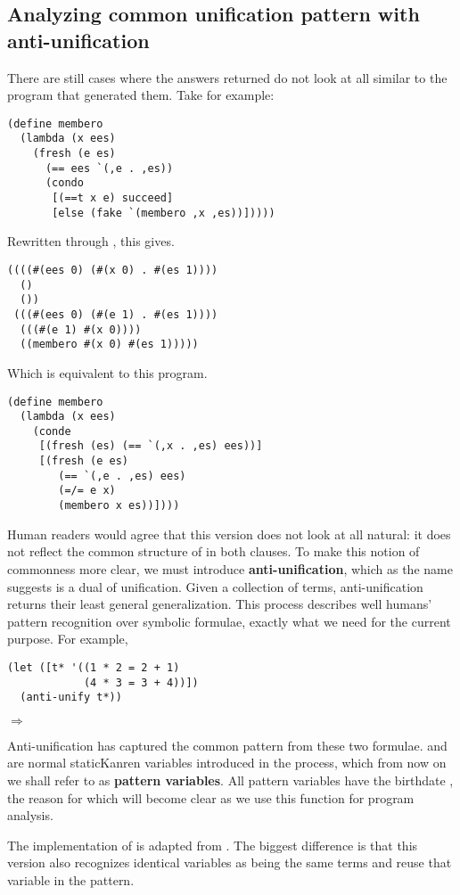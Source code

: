 \subsection{Analyzing common unification pattern with anti-unification}\label{au}
There are still cases where the answers returned do not look at all similar to the program that generated them. Take  for example:
\begin{lstlisting}
(define membero
  (lambda (x ees)
    (fresh (e es)
      (== ees `(,e . ,es))
      (condo
       [(==t x e) succeed]
       [else (fake `(membero ,x ,es))]))))
\end{lstlisting}

Rewritten through , this gives.
\begin{lstlisting}
((((#(ees 0) (#(x 0) . #(es 1)))) 
  ()
  ())
 (((#(ees 0) (#(e 1) . #(es 1))))
  (((#(e 1) #(x 0))))
  ((membero #(x 0) #(es 1)))))
\end{lstlisting}
Which is equivalent to this program.
\begin{lstlisting}
(define membero
  (lambda (x ees)
    (conde
     [(fresh (es) (== `(,x . ,es) ees))]
     [(fresh (e es)
        (== `(,e . ,es) ees)
        (=/= e x)
        (membero x es))])))
\end{lstlisting}
Human readers would agree that this version does not look at all natural: it does not reflect the common structure of  in both clauses. To make this notion of commonness more clear, we must introduce \textbf{anti-unification}, which as the name suggests is a dual of unification. Given a collection of terms, anti-unification returns their least general generalization. This process describes well humans' pattern recognition over symbolic formulae, exactly what we need for the current purpose. For example,
\begin{lstlisting}
(let ([t* '((1 * 2 = 2 + 1)
            (4 * 3 = 3 + 4))])
  (anti-unify t*))
\end{lstlisting}
$\Rightarrow$ 

Anti-unification has captured the common pattern from these two formulae.  and  are normal staticKanren variables introduced in the process, which from now on we shall refer to as \textbf{pattern variables}. All pattern variables have the birthdate , the reason for which will become clear as we use this function for program analysis.

The implementation of  is adapted from \textcite{ostvold2004functional}. The biggest difference is that this version also recognizes identical variables as being the same terms and reuse that variable in the pattern. 

